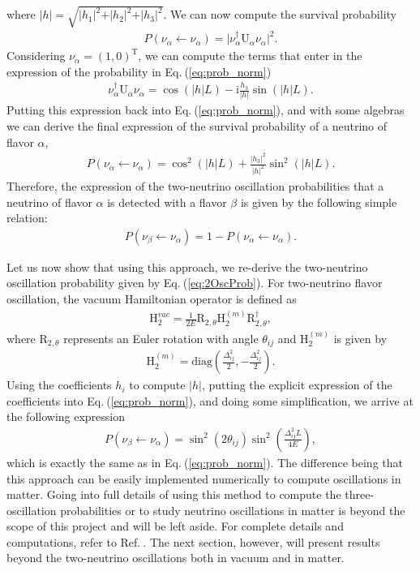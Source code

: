 \documentclass[twocolumn,secnumarabic,amssymb, nobibnotes, aps, prd,10pt]{revtex4-1}
\newcommand{\Eq}[1]{Eq.$\:$(\ref{#1})}
\newcommand{\myref}[1]{Ref.$\:$\cite{#1}}
\begin{document}
where $\vert h \vert = \sqrt{ \vert h_1 \vert^2 + \vert h_2 \vert^2 +
\vert h_3 \vert^2}$. We can now compute the survival probability 
\begin{align}
P (\nu_\alpha \longleftarrow \nu_\alpha) = \vert \nu_\alpha^\dagger \mathrm{U}_\alpha
\nu_\alpha \vert^2 .
\label{eq:prob_norm}
\end{align} 
Considering $\nu_\alpha = (1,0)^\mathrm{T}$, we can compute the terms that enter in the
expression of the probability in \Eq{eq:prob_norm}
\begin{align}
\nu_\alpha^\dagger \mathrm{U}_\alpha \nu_\alpha = \cos (\vert h \vert L) - \mathrm{i}
\frac{h_3}{\vert h \vert} \sin (\vert h \vert L).
\end{align}
Putting this expression back into \Eq{eq:prob_norm}, and with some algebras we can
derive the final expression of the survival probability of a neutrino of flavor $\alpha$,
\begin{align}
P (\nu_\alpha \longleftarrow \nu_\alpha) =  \cos^2 (\vert h \vert L) +
\frac{\vert h_3 \vert^2 }{\vert h \vert^2} \sin^2 (\vert h \vert L).
\end{align}
Therefore, the expression of the two-neutrino oscillation probabilities that a neutrino
of flavor $\alpha$ is detected with a flavor $\beta$ is given by the following simple
relation:
\begin{align}
P (\nu_\beta \longleftarrow \nu_\alpha) = 1 - P (\nu_\alpha \longleftarrow \nu_\alpha).
\end{align}

Let us now show that using this approach, we re-derive the two-neutrino oscillation
probability given by \Eq{eq:2OscProb}. For two-neutrino flavor oscillation, the vacuum
Hamiltonian operator is defined as
\begin{align}
\mathrm{H}_2^{vac} = \frac{1}{2 E} \mathrm{R}_{2, \theta} \mathrm{H}^{(m)}_2 
\mathrm{R}_{2, \theta}^\dagger ,
\end{align}
where $\mathrm{R}_{2, \theta}$ represents an Euler rotation with angle $\theta_{ij}$
and $\mathrm{H}^{(m)}_2$ is given by 
\begin{align}
\mathrm{H}^{(m)}_2 = \mathrm{diag} \left( \frac{\Delta_{ij}^2}{2}, - \frac{\Delta_{ij}^2}{2} \right). 
\end{align}
Using the coefficients $h_i$ to compute $\vert h \vert$, putting the explicit expression 
of the coefficients into \Eq{eq:prob_norm}, and doing some simplification, we arrive at 
the following expression
\begin{align}
P (\nu_\beta \longleftarrow \nu_\alpha) = \sin^2 (2 \theta_{ij}) \sin^2 \left(
\frac{\Delta_{ij}^2 L}{4 E} \right) ,
\end{align} 
which is exactly the same as in \Eq{eq:prob_norm}. The difference being that this approach
can be easily implemented numerically to compute oscillations in matter. Going into full
details of using this method to compute the three-oscillation probabilities or to study
neutrino oscillations in matter is beyond the scope of this project and will be left
aside. For complete details and computations, refer to \myref{}. The next section, however,
will present results beyond the two-neutrino oscillations both in vacuum and in matter.
\end{document}
